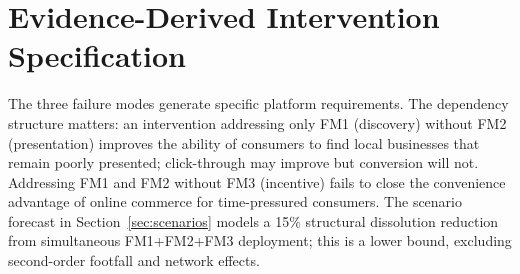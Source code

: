 \documentclass[12pt,a4paper]{article}
\begin{document}
\section{Evidence-Derived Intervention Specification}
\label{sec:intervention}

The three failure modes generate specific platform requirements. The dependency structure
matters: an intervention addressing only FM1 (discovery) without FM2 (presentation)
improves the ability of consumers to find local businesses that remain poorly presented;
click-through may improve but conversion will not. Addressing FM1 and FM2 without FM3
(incentive) fails to close the convenience advantage of online commerce for time-pressured
consumers. The scenario forecast in Section~\ref{sec:scenarios} models a 15\% structural
dissolution reduction from simultaneous FM1+FM2+FM3 deployment; this is a lower bound,
excluding second-order footfall and network effects.
\end{document}
